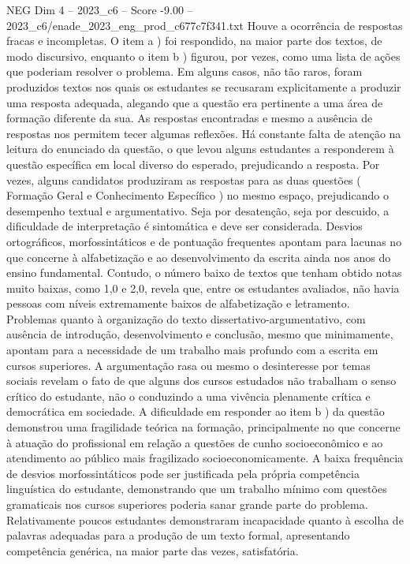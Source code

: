 \begin{textsample}{NEG Dim 4 – 2023\_c6 – Score -9.00 – 2023\_c6/enade\_2023\_eng\_prod\_c677c7f341.txt}
Houve a ocorrência de respostas fracas e incompletas.
O item a ) foi respondido, na maior parte dos textos, de modo discursivo, enquanto o item b ) figurou, por vezes, como uma lista de ações que poderiam resolver o problema.
Em alguns casos, não tão raros, foram produzidos textos nos quais os estudantes se recusaram explicitamente a produzir uma resposta adequada, alegando que a questão era pertinente a uma área de formação diferente da sua.
As respostas encontradas e mesmo a ausência de respostas nos permitem tecer algumas reflexões.
Há constante falta de atenção na leitura do enunciado da questão, o que levou alguns estudantes a responderem à questão específica em local diverso do esperado, prejudicando a resposta.
Por vezes, alguns candidatos produziram as respostas para as duas questões ( Formação Geral e Conhecimento Específico ) no mesmo espaço, prejudicando o desempenho textual e argumentativo.
Seja por desatenção, seja por descuido, a dificuldade de interpretação é sintomática e deve ser considerada.
Desvios ortográficos, morfossintáticos e de pontuação frequentes apontam para lacunas no que concerne à alfabetização e ao desenvolvimento da escrita ainda nos anos do ensino fundamental.
Contudo, o número baixo de textos que tenham obtido notas muito baixas, como 1,0 e 2,0, revela que, entre os estudantes avaliados, não havia pessoas com níveis extremamente baixos de alfabetização e letramento.
Problemas quanto à organização do texto dissertativo-argumentativo, com ausência de introdução, desenvolvimento e conclusão, mesmo que minimamente, apontam para a necessidade de um trabalho mais profundo com a escrita em cursos superiores.
A argumentação rasa ou mesmo o desinteresse por temas sociais revelam o fato de que alguns dos cursos estudados não trabalham o senso crítico do estudante, não o conduzindo a uma vivência plenamente crítica e democrática em sociedade.
A dificuldade em responder ao item b ) da questão demonstrou uma fragilidade teórica na formação, principalmente no que concerne à atuação do profissional em relação a questões de cunho socioeconômico e ao atendimento ao público mais fragilizado socioeconomicamente.
A baixa frequência de desvios morfossintáticos pode ser justificada pela própria competência linguística do estudante, demonstrando que um trabalho mínimo com questões gramaticais nos cursos superiores poderia sanar grande parte do problema.
Relativamente poucos estudantes demonstraram incapacidade quanto à escolha de palavras adequadas para a produção de um texto formal, apresentando competência genérica, na maior parte das vezes, satisfatória.

\end{textsample}

